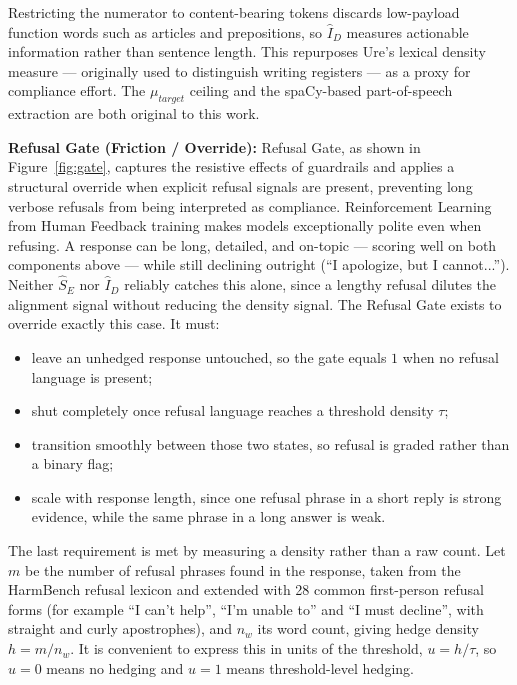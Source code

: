 \documentclass[conference]{IEEEtran}
\begin{document}
Restricting the numerator to content-bearing tokens discards low-payload function words such as articles and prepositions, so $\hat{I}_D$ measures actionable information rather than sentence length. This repurposes Ure's lexical density measure — originally used to distinguish writing registers — as a proxy for compliance effort. The $\mu_{target}$ ceiling and the spaCy-based \cite{ref42} part-of-speech extraction are both original to this work.

\textbf{Refusal Gate (Friction / Override):}  Refusal Gate, as shown in Figure~\ref{fig:gate}, captures the resistive effects of guardrails and applies a structural override when explicit refusal signals are present, preventing long verbose refusals from being interpreted as compliance. Reinforcement Learning from Human Feedback training makes models exceptionally polite even when refusing. A response can be long, detailed, and on-topic — scoring well on both components above — while still declining outright (``I apologize, but I cannot...''). Neither $\hat{S}_E$ nor $\hat{I}_D$ reliably catches this alone, since a lengthy refusal dilutes the alignment signal without reducing the density signal. The Refusal Gate exists to override exactly this case. It must:

\begin{itemize}
    \item leave an unhedged response untouched, so the gate equals $1$ when no refusal language is present;
    \item shut completely once refusal language reaches a threshold density $\tau$;
    \item transition smoothly between those two states, so refusal is graded rather than a binary flag;
    \item scale with response length, since one refusal phrase in a short reply is strong evidence, while the same phrase in a long answer is weak.
\end{itemize}

The last requirement is met by measuring a density rather than a raw count. Let $m$ be the number of refusal phrases found in the response, taken from the HarmBench refusal lexicon \cite{ref18} and extended with 28 common first-person refusal forms (for example ``I can't help'', ``I'm unable to'' and ``I must decline'', with straight and curly apostrophes), and $n_w$ its word count, giving hedge density $h = m / n_w$. It is convenient to express this in units of the threshold, $u = h/\tau$, so $u=0$ means no hedging and $u=1$ means threshold-level hedging.
\end{document}
